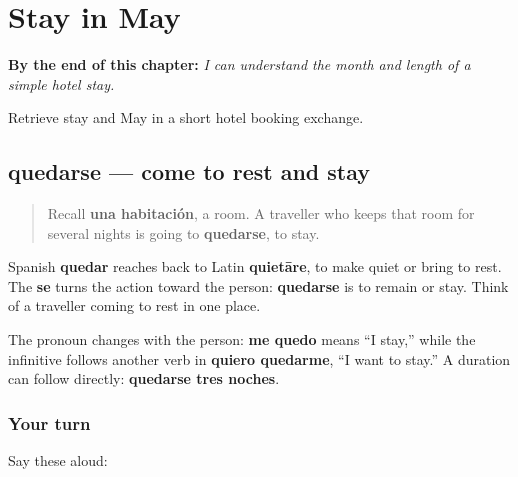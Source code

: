 
\chapter{Stay in May}
\label{ch:quedarse-mayo}

\begin{chapteropening}
\textbf{By the end of this chapter:} \emph{I can understand the month and length of a simple hotel stay.}

Retrieve stay and May in a short hotel booking exchange.
\end{chapteropening}

\section[quedarse]{quedarse — come to rest and stay}

\label{lesson:ES-C416-quedarse}



\begin{quote}
Recall \textbf{una habitación}, a room. A traveller who keeps that room for several nights is going to \textbf{quedarse}, to stay.
\end{quote}

\begin{cousinweb}
Spanish \textbf{quedar} reaches back to Latin \textbf{quietāre}, to make quiet or bring to rest. The \textbf{se} turns the action toward the person: \textbf{quedarse} is to remain or stay. Think of a traveller coming to rest in one place.
\end{cousinweb}

\begin{grammarlens}[title={Grammar Lens: say who stays}]
The pronoun changes with the person: \textbf{me quedo} means “I stay,” while the infinitive follows another verb in \textbf{quiero quedarme}, “I want to stay.” A duration can follow directly: \textbf{quedarse tres noches}.
\end{grammarlens}

\subsection*{Your turn}
Say these aloud:

